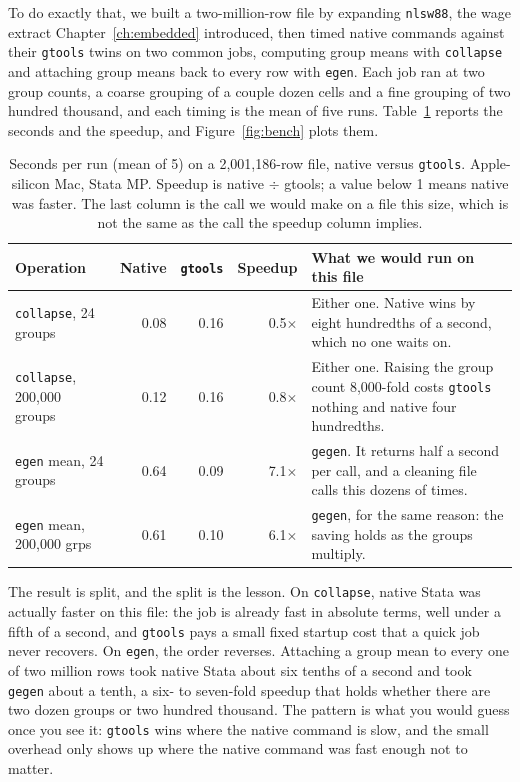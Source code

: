 \documentclass[
    a4paper,
    fontsize=10pt,
    twoside=true,
    numbers=noenddot,
]{kaobook}
\begin{document}
To do exactly that, we built a two-million-row file by expanding \texttt{nlsw88}, the wage extract Chapter~\ref{ch:embedded} introduced, then timed native commands against their \texttt{gtools} twins on two common jobs, computing group means with \texttt{collapse} and attaching group means back to every row with \texttt{egen}. Each job ran at two group counts, a coarse grouping of a couple dozen cells and a fine grouping of two hundred thousand, and each timing is the mean of five runs. Table~\ref{tab:bench} reports the seconds and the speedup, and Figure~\ref{fig:bench} plots them.

\begin{table}[htbp]
\footnotesize
\caption[gtools timings on two million rows]{Seconds per run (mean of 5) on a 2{,}001{,}186-row file, native versus \texttt{gtools}. Apple-silicon Mac, Stata MP. Speedup is native $\div$ gtools; a value below 1 means native was faster. The last column is the call we would make on a file this size, which is not the same as the call the speedup column implies.}
\label{tab:bench}
\noindent\begin{tabular}{@{}lrrrp{8.4cm}@{}}
\hline
Operation & Native & \texttt{gtools} & Speedup & What we would run on this file \\
\hline
\texttt{collapse}, 24 groups        & 0.08 & 0.16 & 0.5$\times$ & Either one. Native wins by eight hundredths of a second, which no one waits on. \\
\texttt{collapse}, 200{,}000 groups & 0.12 & 0.16 & 0.8$\times$ & Either one. Raising the group count 8{,}000-fold costs \texttt{gtools} nothing and native four hundredths. \\
\texttt{egen} mean, 24 groups       & 0.64 & 0.09 & 7.1$\times$ & \texttt{gegen}. It returns half a second per call, and a cleaning file calls this dozens of times. \\
\texttt{egen} mean, 200{,}000 grps  & 0.61 & 0.10 & 6.1$\times$ & \texttt{gegen}, for the same reason: the saving holds as the groups multiply. \\
\hline
\end{tabular}
\end{table}

The result is split, and the split is the lesson. On \texttt{collapse}, native Stata was actually faster on this file: the job is already fast in absolute terms, well under a fifth of a second, and \texttt{gtools} pays a small fixed startup cost that a quick job never recovers. On \texttt{egen}, the order reverses. Attaching a group mean to every one of two million rows took native Stata about six tenths of a second and took \texttt{gegen} about a tenth, a six- to seven-fold speedup that holds whether there are two dozen groups or two hundred thousand. The pattern is what you would guess once you see it: \texttt{gtools} wins where the native command is slow, and the small overhead only shows up where the native command was fast enough not to matter.
\end{document}
